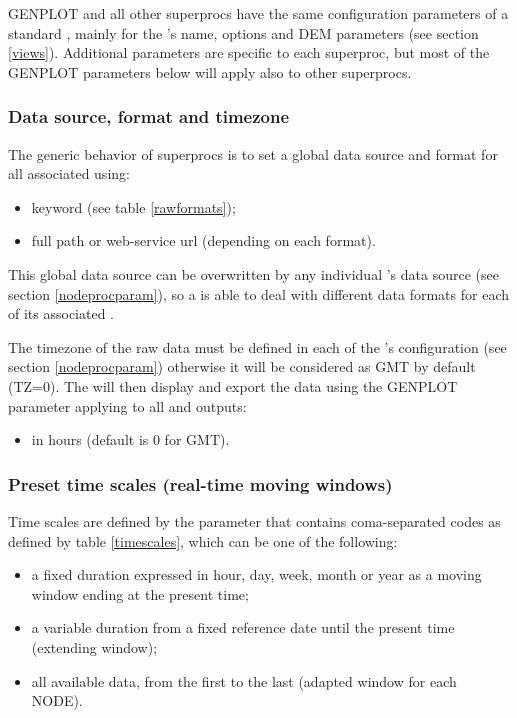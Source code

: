 GENPLOT and all other superprocs have the same configuration parameters of a standard , mainly for the 's name,  options and DEM parameters (see section \ref{views}). Additional parameters are specific to each superproc, but most of the GENPLOT parameters below will apply also to other superprocs.

\subsubsection{Data source, format and timezone}

The generic behavior of superprocs is to set a global data source and format for all associated  using:
\begin{itemize}
\item {} keyword (see table \ref{rawformats});
\item {} full path or web-service url (depending on each format).
\end{itemize}

This global  data source can be overwritten by any individual 's data source (see section \ref{nodeprocparam}), so a  is able to deal with different data formats for each of its associated .

The timezone of the raw data must be defined in each of the 's configuration (see section \ref{nodeprocparam}) otherwise it will be considered as GMT by default (TZ=0). The  will then display and export the data using the GENPLOT parameter applying to all  and outputs:
\begin{itemize}
\item {} in hours (default is 0 for GMT).
\end{itemize}


\subsubsection{Preset time scales (real-time moving windows)}

Time scales are defined by the  parameter that contains coma-separated codes as defined by table \ref{timescales}, which can be one of the following:
\begin{itemize}
\item a fixed duration expressed in hour, day, week, month or year as a moving window ending at the present time;
\item a variable duration from a fixed reference date until the present time (extending window);
\item all available data, from the first to the last (adapted window for each NODE).
\end{itemize}

